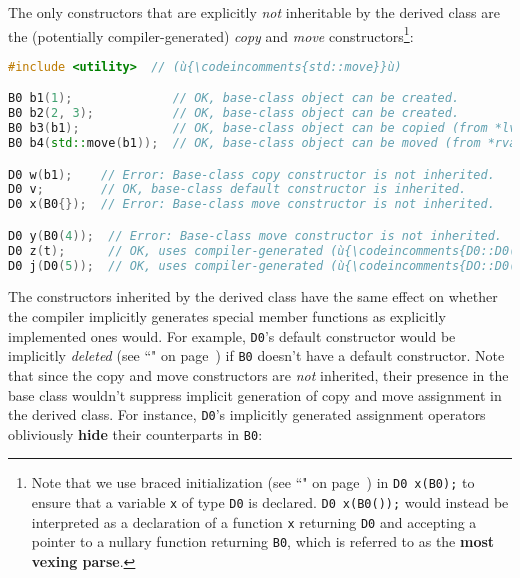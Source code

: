 \noindent The only constructors that are explicitly \emph{not} inheritable by the
derived class are the (potentially compiler-generated) \emph{copy} and
\emph{move} constructors{\cprotect\footnote{Note that we use
 braced initialization (see ``" on page~\pageref{bracedinit}) in \texttt{D0}~\texttt{x(B0{});}
  to ensure that a variable \texttt{x} of type \texttt{D0} is declared.
  \texttt{D0}~\texttt{x(B0());} would instead be interpreted as a
  declaration of a function \texttt{x} returning \texttt{D0} and
  accepting a pointer to a nullary function returning \texttt{B0}, which
  is referred to as the \textbf{most vexing parse}.}}:

\begin{lstlisting}[language=C++]
#include <utility>  // (ù{\codeincomments{std::move}}ù)

B0 b1(1);              // OK, base-class object can be created.
B0 b2(2, 3);           // OK, base-class object can be created.
B0 b3(b1);             // OK, base-class object can be copied (from *lvalue*).
B0 b4(std::move(b1));  // OK, base-class object can be moved (from *rvalue).

D0 w(b1);    // Error: Base-class copy constructor is not inherited.
D0 v;        // OK, base-class default constructor is inherited.
D0 x(B0{});  // Error: Base-class move constructor is not inherited.

D0 y(B0(4));  // Error: Base-class move constructor is not inherited.
D0 z(t);      // OK, uses compiler-generated (ù{\codeincomments{D0::D0(const D0\&)}}ù)
D0 j(D0(5));  // OK, uses compiler-generated (ù{\codeincomments{DO::D0(D\&\&)}}ù)
\end{lstlisting}

\noindent The constructors inherited by the derived class have the same effect on
whether the compiler implicitly generates special member functions as
explicitly implemented ones would. For example, \texttt{D0}'s default
constructor would be implicitly \emph{deleted} (see ``" on page~\pageref{deleted-functions}) if
\texttt{B0} doesn't have a default constructor. Note that since the copy
and move constructors are \emph{not} inherited, their presence in the
base class wouldn't suppress implicit generation of copy and move
assignment in the derived class. For instance, \texttt{D0}'s implicitly
generated assignment operators obliviously \textbf{hide} their
counterparts in \texttt{B0}:

